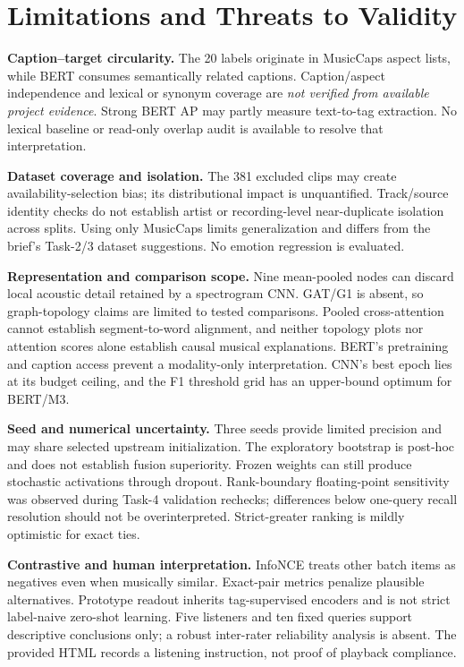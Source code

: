 \documentclass[conference]{IEEEtran}
\begin{document}
\section{Limitations and Threats to Validity}\label{sec:limits}
\textbf{Caption--target circularity.} The 20 labels originate in MusicCaps aspect lists, while BERT consumes semantically related captions. Caption/aspect independence and lexical or synonym coverage are \emph{not verified from available project evidence}. Strong BERT AP may partly measure text-to-tag extraction. No lexical baseline or read-only overlap audit is available to resolve that interpretation.

\textbf{Dataset coverage and isolation.} The 381 excluded clips may create availability-selection bias; its distributional impact is unquantified. Track/source identity checks do not establish artist or recording-level near-duplicate isolation across splits. Using only MusicCaps limits generalization and differs from the brief's Task-2/3 dataset suggestions. No emotion regression is evaluated.

\textbf{Representation and comparison scope.} Nine mean-pooled nodes can discard local acoustic detail retained by a spectrogram CNN. GAT/G1 is absent, so graph-topology claims are limited to tested comparisons. Pooled cross-attention cannot establish segment-to-word alignment, and neither topology plots nor attention scores alone establish causal musical explanations. BERT's pretraining and caption access prevent a modality-only interpretation. CNN's best epoch lies at its budget ceiling, and the F1 threshold grid has an upper-bound optimum for BERT/M3.

\textbf{Seed and numerical uncertainty.} Three seeds provide limited precision and may share selected upstream initialization. The exploratory bootstrap is post-hoc and does not establish fusion superiority. Frozen weights can still produce stochastic activations through dropout. Rank-boundary floating-point sensitivity was observed during Task-4 validation rechecks; differences below one-query recall resolution should not be overinterpreted. Strict-greater ranking is mildly optimistic for exact ties.

\textbf{Contrastive and human interpretation.} InfoNCE treats other batch items as negatives even when musically similar. Exact-pair metrics penalize plausible alternatives. Prototype readout inherits tag-supervised encoders and is not strict label-naive zero-shot learning. Five listeners and ten fixed queries support descriptive conclusions only; a robust inter-rater reliability analysis is absent. The provided HTML records a listening instruction, not proof of playback compliance.
\end{document}
